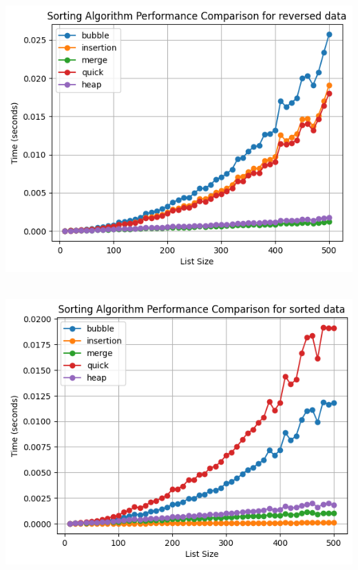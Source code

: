 \documentclass[aspectratio=169]{beamer}
\begin{document}
\begin{frame}{}
  \vspace*{-2cm}
  \includegraphics[height=1.3\textheight]{graphs/reversed.png}\\\
\end{frame}

\begin{frame}{}
  \vspace*{-2cm}
  \includegraphics[height=1.3\textheight]{graphs/sorted.png}
\end{frame}
\end{document}
